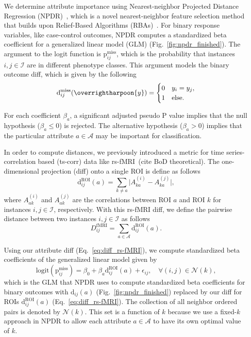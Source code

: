 \documentclass[10pt,letterpaper]{article}\usepackage[]{graphicx}\usepackage[]{color}
\begin{document}
\bigskip

We determine attribute importance using Nearest-neighbor Projected Distance Regression (NPDR)~\cite{npdr}, which is a novel nearest-neighbor feature selection method that builds upon Relief-Based Algorithms (RBAs)~\cite{robnik2003,urbanowicz17}. For binary response variables, like case-control outcomes, NPDR computes a standardized beta coefficient for a generalized linear model (GLM) (Fig.~\ref{fig:npdr_finished}). The argument to the logit function is $\text{p}^\text{miss}_{ij}$, which is the probability that instances $i,j \in \mathcal{I}$ are in different phenotype classes. This argument models the binary outcome diff, which is given by the following
%
\begin{equation}\label{eq:diff_outcome}
\text{d}^\text{miss}_{ij}(\overrightharpoon{y})=\begin{cases}
0 & y_i = y_j, \\
1 & \text{else}.
\end{cases}
\end{equation}

For each coefficient $\beta_a$, a significant adjusted pseudo P value implies that the null hypothesis ($\beta_a \leq 0$) is rejected. The alternative hypothesis ($\beta_a > 0$) implies that the particular attribute $a \in \mathcal{A}$ may be important for classification.

In order to compute distances, we previously introduced a metric for time series-correlation based (ts-corr) data like rs-fMRI~(cite BoD theoretical). The one-dimensional projection (diff) onto a single ROI is define as follows
%
\begin{equation}\label{eq:diff_rs-fMRI}
\text{d}^\text{ROI}_{ij}(a) = \sum_{k \neq a}\bigl|A^{(i)}_{ka} - A^{(j)}_{ka}\bigr|,
\end{equation}
%
where $A^{(i)}_{ak}$ and $A^{(j)}_{ak}$ are the correlations between ROI $a$ and ROI $k$ for instances $i,j \in \mathcal{I}$, respectively. With this rs-fMRI diff, we define the pairwise distance between two instances $i,j \in \mathcal{I}$ as follows
%
\begin{equation}\label{eq:D_rs-fMRI}
D^\text{fMRI}_{ij} = \sum_{a \in \mathcal{A}} \text{d}^\text{ROI}_{ij}(a).
\end{equation}

Using our attribute diff (Eq.~\ref{eq:diff_rs-fMRI}), we compute standardized beta coefficients of the generalized linear model given by
%
\begin{equation}\label{eq:glm_roi}
\text{logit}\left(\text{p}^\text{miss}_{ij}\right) = \beta_0 + \beta_a \text{d}^\text{ROI}_{ij}(a) + \epsilon_{ij}, \quad \forall(i,j) \in \mathcal{N}(k),
\end{equation}
%
which is the GLM that NPDR uses to compute standardized beta coefficients for binary outcomes with $\text{d}_{ij}(a)$ (Fig.~\ref{fig:npdr_finished}) replaced by our diff for ROIs $\text{d}^\text{ROI}_{ij}(a)$ (Eq.~\ref{eq:diff_rs-fMRI}). The collection of all neighbor ordered pairs is denoted by $\mathcal{N}(k)$. This set is a function of $k$ because we use a fixed-$k$ approach in NPDR to allow each attribute $a \in \mathcal{A}$ to have its own optimal value of $k$.
\end{document}
